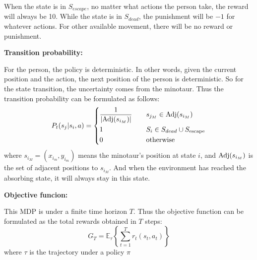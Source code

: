 \documentclass{article}
\begin{document}
When the state is in $S_{escape}$, no matter what actions the person take, the reward will always be 10.
While the state is in $S_{dead}$, the punishment will be $-1$ for whatever actions.
For other available movement, there will be no reward or punishment.

\textbf{Transition probability:}

For the person, the policy is deterministic. In other words, given the current position and the action, the next position of the person is deterministic.
So for the state transition, the uncertainty comes from the minotaur. Thus the transition probability can be formulated as follows:
\begin{equation*}
  P_t(s_j|s_i,a) =
  \begin{dcases}
    \frac{1}{|\textup{Adj}(s_{i_M})|}
        \quad &s_{j_M}\in \textup{Adj}(s_{i_M}) \\
    1   \quad &S_i\in S_{dead}\cup S_{\text{escape}} \\
    0   \quad &\textup{otherwise}
  \end{dcases}
\end{equation*}
where $s_{i_M}=(x_{i_m},y_{i_m})$ means the minotaur's position at state $i$, and $\textup{Adj}(s_{i_M})$ is the set of adjacent positions to $s_{i_M}$.
And when the environment has reached the absorbing state, it will always stay in this state.

\textbf{Objective funcion:}

This MDP is under a finite time horizon $T$. Thus the objective function can be formulated as the total rewards obtained in $T$ steps:
\begin{equation*}
  G_T=\mathbb{E}_{\tau}\left\{\sum_{t=1}^T r_t(s_t,a_t)\right\}
\end{equation*}
where $\tau$ is the trajectory under a policy $\pi$
\end{document}

